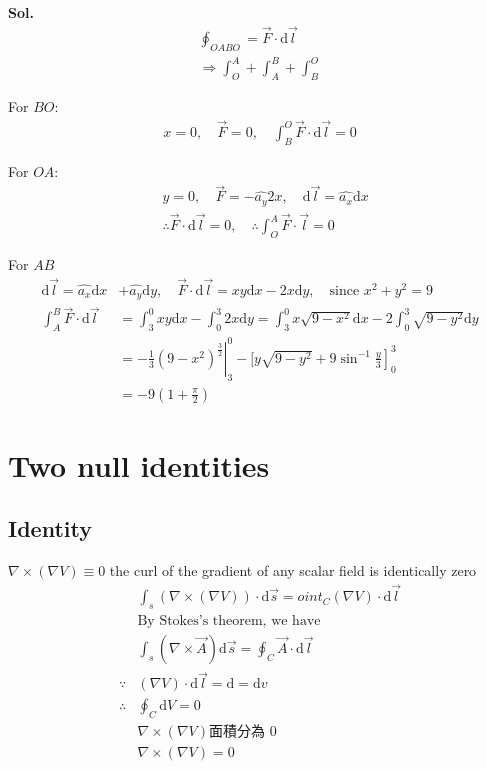 \documentclass[12pt, a4paper]{article}
\begin{document}
\textbf{Sol.} \\
\begin{align*}
	\oint_{OABO} = \vec{F} \cdot \text{d} \vec{l} \\
	\Rightarrow \int_{O}^{A} + \int_{A}^{B} + \int_{B}^{O}
\end{align*}

For $BO$: 
\begin{align*}
	x = 0, \quad
	\vec{F} = 0, \quad
	\int_{B}^{O} \vec{F} \cdot \text{d} \vec{l} = 0
\end{align*}

For $OA$:
	\begin{align*}
	&y = 0, \quad
	\vec {F} = - \hat{a_y} 2x, \quad
	\text{d} \vec{l} = \hat{a_x} \text{d} x \\
	&\therefore \vec{F} \cdot \text{d} \vec{l} = 0, \quad
	\therefore \int_{O}^{A} \vec{F} \cdot \vec{l} = 0
\end{align*}

For $AB$
\begin{align*}
	\text{d} \vec{l} = \hat{a_x} \text{d}x &+ \hat{a_y} \text{d}y, \quad
	\vec{F} \cdot \text{d} \vec{l} = xy \text{d}x -2x \text{d}y, \quad
	\text{since } x^{2} + y^{2} = 9 \\
	\int_{A}^{B} \vec{F} \cdot \text{d} \vec{l}
	&= \int_{3}^{0} xy \text{d}x - \int_{0}^{3} 2x \text{d}y
	= \int_{3}^{0} x \sqrt{9-x^{2}} \text{d}x - 2\int_{0}^{3} \sqrt{9-y^2} \text{d}y \\
	&=\left. -\frac{1}{3}(9-x^2)^{\frac{3}{2}} \right|_3^0 - \left.[y \sqrt{9-y^2} + 9\sin^{-1}\frac{y}{3} \right]_0^3\\
	&= -9(1 + \frac{\pi}{2})
\end{align*}
\newpage

\section*{Two null identities}
\subsection*{Identity }
$\nabla \times (\nabla V) \equiv 0$ the curl of the gradient of any scalar field is identically zero \\
\begin{align*}
	&\int_{s} (\nabla \times (\nabla V)) \cdot \text{d} \vec{s} = oint_{C} (\nabla V) \cdot \text{d} \vec{l} \\ 
	&\text{By Stokes's theorem, we have} \\
	&\int_{s} (\nabla \times \vec{A}) \text{d} \vec{s} = \oint_{C} \vec {A} \cdot \text{d} \vec{l} \\
	\because &(\nabla V) \cdot \text{d} \vec{l} = \text{d} = \text{d} v \\
	\therefore &\oint_C \text{d} V = 0 \\
	&\nabla \times (\nabla V) \text{面積分為 0} \\
	&\nabla \times (\nabla V) = 0
\end{align*}
\end{document}
